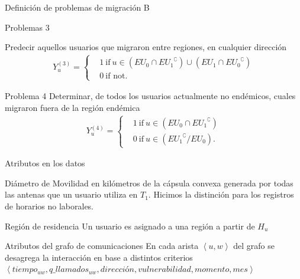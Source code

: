 \documentclass[xcolor=x11names]{beamer}
\begin{document}
\begin{frame}{Definición de problemas de migración B}
	\begin{block}{Problemas 3}

		Predecir aquellos usuarios que migraron entre regiones, en cualquier dirección
		\begin{align*}
			Y^{(3)}_u =
			\begin{cases}
				&1 \ \mbox{if} \ u \in (EU_{0} \cap { EU_{1} }^{\complement}) \cup (EU_{1} \cap { EU_{0} }^{\complement}) \\
				&0 \ \mbox{if not}.
			\end{cases}
		\end{align*}
	\end{block}

	\begin{block}{Problema 4}
		Determinar, de todos los usuarios actualmente no endémicos, cuales migraron fuera de la región endémica
		\begin{align*}
			Y^{(4)}_u =
			\begin{cases}
				& 1 \ \mbox{if} \ u \in ( EU_{0} \cap { EU_{1} }^{\complement})    \\
				& 0 \ \mbox{if} \ u \in ( { EU_{1} }^{\complement} / EU_{0}).
			\end{cases}
		\end{align*}

	\end{block}

\end{frame}


\begin{frame}{Atributos en los datos}

	\begin{block}{Diámetro de Movilidad}
		en kilómetros de la cápsula convexa generada por todas las antenas que un usuario utiliza en $T_1$. Hicimos la distinción para los registros de horarios no laborales.
	\end{block}

	\begin{block}{Región de residencia}
	Un usuario es asignado a una región a partir de $H_u$
\end{block}


	\begin{block}{Atributos del grafo de comunicaciones}
		En cada arista $\left< u, w \right>$ del grafo se desagrega la interacción en base a distintos criterios
		$\left< tiempo_{uw}, q\_llamados_{uw}, dirección, vulnerabilidad, momento, mes \right>$ 
%	
\end{block}


\end{frame}
\end{document}
